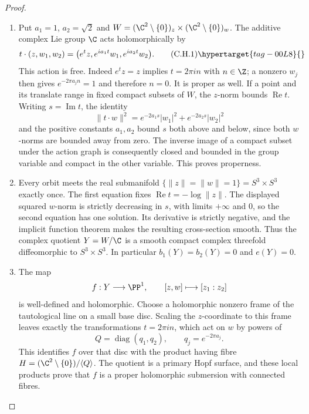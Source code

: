 \begin{proof}

\begin{enumerate}[label={$\langle1\rangle$\arabic*.},leftmargin=*]
\item Put $a_1=1$, $a_2=\sqrt2$ and
$W=(\C^2\setminus\{0\})_z\times(\C^2\setminus\{0\})_w$.
The additive complex Lie group $\C$ acts holomorphically by
\[
t\cdot(z,w_1,w_2)
 =\bigl(e^t z,e^{ia_1t}w_1,e^{ia_2t}w_2\bigr).
\tag{C.H.1}\hypertarget{tag-00L8}{}\label{cdp:eq:C.H.1}
\]
This action is free. Indeed $e^t z=z$ implies $t=2\pi in$ with
$n\in\Z$; a nonzero $w_j$ then gives $e^{-2\pi a_jn}=1$ and
therefore $n=0$. It is proper as well. If a point and its translate
range in fixed compact subsets of $W$, the $z$-norm bounds
$\operatorname{Re}t$. Writing $s=\operatorname{Im}t$, the identity
\[
\|t\cdot w\|^2
 =e^{-2a_1s}|w_1|^2+e^{-2a_2s}|w_2|^2
\]
and the positive constants $a_1,a_2$ bound $s$ both above and
below, since both $w$-norms are bounded away from zero. The inverse
image of a compact subset under the action graph is consequently
closed and bounded in the group variable and compact in the other
variable. This proves properness.

\item Every orbit meets the real submanifold
$\{\|z\|=\|w\|=1\}=S^3\times S^3$ exactly once.
The first equation fixes $\operatorname{Re}t=-\log\|z\|$.
The displayed squared $w$-norm is strictly decreasing in $s$,
with limits $+\infty$ and $0$, so the second equation has one
solution. Its derivative is strictly negative, and the implicit
function theorem makes the resulting cross-section smooth.
Thus the complex quotient $Y=W/\C$ is a smooth compact complex
threefold diffeomorphic to $S^3\times S^3$. In particular
$b_1(Y)=b_2(Y)=0$ and $e(Y)=0$.

\item The map
\[
f:Y\longrightarrow\PP^1,\qquad [z,w]\longmapsto[z_1:z_2]
\]
is well-defined and holomorphic. Choose a holomorphic nonzero
frame of the tautological line on a small base disc. Scaling the
$z$-coordinate to this frame leaves exactly the transformations
$t=2\pi in$, which act on $w$ by powers of
\[
Q=\operatorname{diag}(q_1,q_2),\qquad
q_j=e^{-2\pi a_j}.
\]
This identifies $f$ over that disc with the product having fibre
$H=(\C^2\setminus\{0\})/\langle Q\rangle$.
The quotient is a primary Hopf surface, and these local products
prove that $f$ is a proper holomorphic submersion with connected
fibres.


\end{enumerate}
\end{proof}

